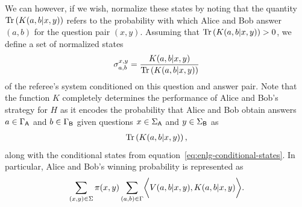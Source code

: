 We can however, if we wish, normalize these states by noting that the quantity $\operatorname{Tr}\left(K(a,b|x,y)\right)$ refers to the probability with which Alice and Bob answer $(a,b)$ for the question pair $(x,y)$. Assuming that $\operatorname{Tr} \left( K(a,b|x,y) \right) > 0$, we define a set of normalized states 
\begin{align} \label{eq:enlg-conditional-states}
	\sigma_{a,b}^{x,y} = \frac{K(a,b|x,y)}{\operatorname{Tr} \left( K(a,b|x,y) \right)}
\end{align}
of the referee's system conditioned on this question and answer pair. Note that the function $K$ completely determines the performance of Alice and Bob's strategy for $H$ as it encodes the probability that Alice and Bob obtain answers $a \in \Gamma_{\mathsf{A}}$ and $b \in \Gamma_{\mathsf{B}}$ given questions $x \in \Sigma_{\mathsf{A}}$ and $y \in \Sigma_{\mathsf{B}}$ as
\begin{align}
	\operatorname{Tr} \left( K(a,b|x,y)	\right),
\end{align} 
along with the conditional states from equation~\eqref{eq:enlg-conditional-states}. In particular, Alice and Bob's winning probability is represented as 
\begin{align} \label{eq:quantum-winning-probability-kabxy}
	\sum_{(x,y) \in \Sigma} \pi(x,y) \sum_{(a,b) \in \Gamma} \biggl\langle V(a,b|x,y), K(a,b|x,y) \biggr\rangle. 
\end{align}


